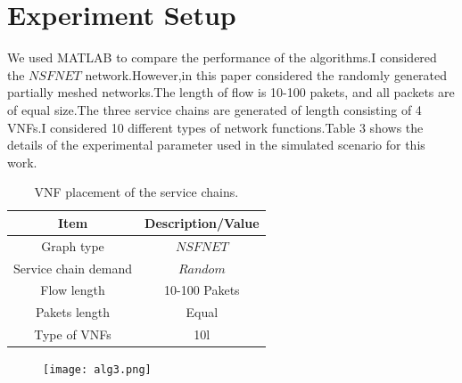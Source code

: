 \documentclass[12pt]{article}
\begin{document}
\section{Experiment Setup}

We used MATLAB to compare the performance of the
algorithms.I considered the $NSFNET$ network.However,in this paper considered the randomly generated partially meshed networks.The length of flow is 10-100 pakets, and all packets are of equal size.The three service chains are generated of length consisting of 4 VNFs.I considered 10 different types of network functions.Table 3 shows the details of the experimental parameter used in the simulated scenario for this work.
\begin{table}[t!]
\caption{VNF placement of the service chains.}

\centering
\begin{tabular}{|c|c|} 
 \hline
Item&Description/Value \\ [0.5ex] 
 \hline 
Graph type& $NSFNET$ \\ [0.5ex]  
 \hline
Service chain demand&$Random$ \\ [0.5ex]
 \hline
Flow length&10-100 Pakets \\ [0.5ex]
 \hline
Pakets length&Equal\\ [1ex]
\hline
Type of VNFs&10l\\ [1ex]
 \hline
\end{tabular}
\label{table:1}
\end{table}
\begin{figure}[!t] \label{fig:6}
  \texttt{[image: alg3.png]}
\end{figure}
\end{document}
